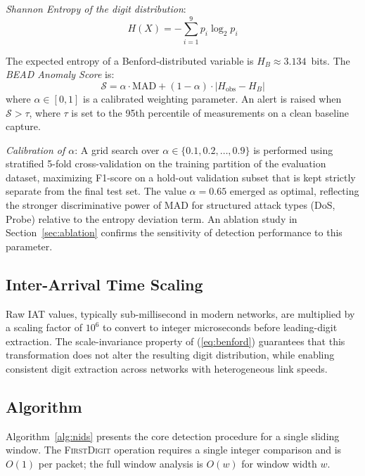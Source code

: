 \documentclass[conference]{IEEEtran}
\begin{document}
\textit{Shannon Entropy of the digit distribution}:
\begin{equation}
  H(X) = -\sum_{i=1}^{9} p_i \log_2 p_i
  \label{eq:entropy}
\end{equation}

The expected entropy of a Benford-distributed variable is
$H_B \approx 3.134$~bits. The \textit{BEAD Anomaly Score} is:
\begin{equation}
  \mathcal{S} = \alpha \cdot \text{MAD} + (1-\alpha)\cdot
                \bigl|H_{\mathrm{obs}} - H_B\bigr|
  \label{eq:hybrid}
\end{equation}
where $\alpha \in [0,1]$ is a calibrated weighting parameter.
An alert is raised when $\mathcal{S} > \tau$, where $\tau$ is set to the
95th percentile of measurements on a clean baseline capture.

\textit{Calibration of $\alpha$}: A grid search over
$\alpha \in \{0.1, 0.2, \ldots, 0.9\}$ is performed using stratified
5-fold cross-validation on the training partition of the evaluation dataset,
maximizing F1-score on a hold-out validation subset that is kept strictly
separate from the final test set. The value $\alpha = 0.65$ emerged as
optimal, reflecting the stronger discriminative power of MAD for
structured attack types (DoS, Probe) relative to the entropy deviation
term. An ablation study in Section~\ref{sec:ablation} confirms the
sensitivity of detection performance to this parameter.

\subsection{Inter-Arrival Time Scaling}

Raw IAT values, typically sub-millisecond in modern networks, are multiplied
by a scaling factor of $10^6$ to convert to integer microseconds before
leading-digit extraction. The scale-invariance property of
(\ref{eq:benford}) guarantees that this transformation does not alter the
resulting digit distribution, while enabling consistent digit extraction
across networks with heterogeneous link speeds.

\subsection{Algorithm}

Algorithm~\ref{alg:nids} presents the core detection procedure for a single
sliding window. The \textsc{FirstDigit} operation requires a single integer
comparison and is $O(1)$ per packet; the full window analysis is $O(w)$
for window width $w$.
\end{document}
